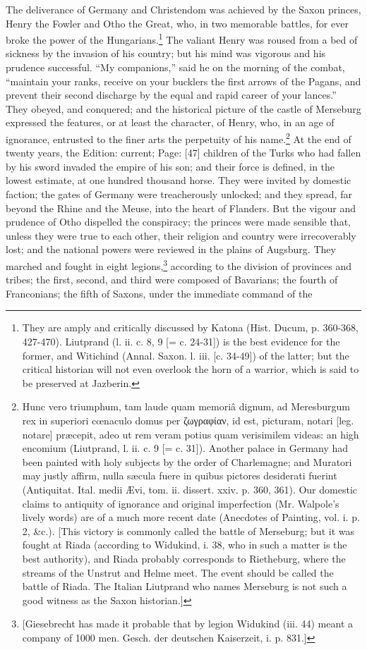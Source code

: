 The deliverance of Germany and Christendom was achieved by the Saxon princes, Henry the Fowler and Otho the Great, who, in two memorable battles, for ever broke the power of the Hungarians.\footnote{They are amply and critically discussed by Katona (Hist. Ducum, p. 360-368, 427-470). Liutprand (l. ii. c. 8, 9 [= c. 24-31]) is the best evidence for the former, and Witichind (Annal. Saxon. l. iii. [c. 34-49]) of the latter; but the critical historian will not even overlook the horn of a warrior, which is said to be preserved at Jazberin.} The valiant Henry was roused from a bed of sickness by the invasion of his country; but his mind was vigorous and his prudence successful. \texthebrew{“}My companions,\texthebrew{}” said he on the morning of the combat, \texthebrew{“}maintain your ranks, receive on your bucklers the first arrows of the Pagans, and prevent their second discharge by the equal and rapid career of your lances.\texthebrew{}” They obeyed, and conquered; and the historical picture of the castle of Merseburg expressed the features, or at least the character, of Henry, who, in an age of ignorance, entrusted to the finer arts the perpetuity of his name.\footnote{Hunc vero triumphum, tam laude quam memoriâ dignum, ad Meresburgum rex in superiori cœnaculo domus per \textgreek{ζωγραφίαν}, id est, picturam, notari [leg. notare] præcepit, adeo ut rem veram potius quam verisimilem videas: an high encomium (Liutprand, l. ii. c. 9 [= c. 31]). Another palace in Germany had been painted with holy subjects by the order of Charlemagne; and Muratori may justly affirm, nulla sæcula fuere in quibus pictores desiderati fuerint (Antiquitat. Ital. medii Ævi, tom. ii. dissert. xxiv. p. 360, 361). Our domestic claims to antiquity of ignorance and original imperfection (Mr. Walpole\texthebrew{}’s lively words) are of a much more recent date (Anecdotes of Painting, vol. i. p. 2, \&c.). [This victory is commonly called the battle of Merseburg; but it was fought at Riada (according to Widukind, i. 38, who in such a matter is the best authority), and Riada probably corresponds to Rietheburg, where the streams of the Unstrut and Helme meet. The event should be called the battle of Riada. The Italian Liutprand who names Merseburg is not such a good witness as the Saxon historian.]} At the end of twenty years, the Edition: current; Page: [47] children of the Turks who had fallen by his sword invaded the empire of his son; and their force is defined, in the lowest estimate, at one hundred thousand horse. They were invited by domestic faction; the gates of Germany were treacherously unlocked; and they spread, far beyond the Rhine and the Meuse, into the heart of Flanders. But the vigour and prudence of Otho dispelled the conspiracy; the princes were made sensible that, unless they were true to each other, their religion and country were irrecoverably lost; and the national powers were reviewed in the plains of Augsburg. They marched and fought in eight legions,\footnote{[Giesebrecht has made it probable that by legion Widukind (iii. 44) meant a company of 1000 men. Gesch. der deutschen Kaiserzeit, i. p. 831.]} according to the division of provinces and tribes; the first, second, and third were composed of Bavarians; the fourth of Franconians; the fifth of Saxons, under the immediate command of the 